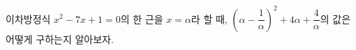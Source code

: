 이차방정식 $x^2-7x+1=0$의 한 근을 $x=\alpha$라 할 때, $\left(\alpha-\dfrac{1}{\alpha}\right)^2+4\alpha+\dfrac{4}{\alpha}$의 값은 어떻게 구하는지 알아보자.
